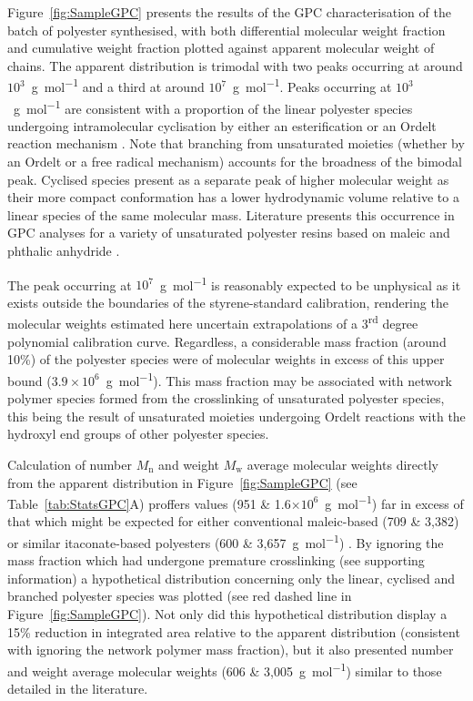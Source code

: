 Figure~\ref{fig:SampleGPC} presents the results of the GPC characterisation
 of the batch of polyester synthesised, with both differential molecular
 weight fraction and cumulative weight fraction plotted against apparent
 molecular weight of chains.
The apparent distribution is trimodal with two peaks occurring at around 
 \(10^{3}\)~\unit{\gram\per\mole} and a third at around 
 \(10^{7}\)~\unit{\gram\per\mole}.
Peaks occurring at \(10^{3}\)~\unit{\gram\per\mole} are consistent with
 a proportion of the linear polyester species undergoing intramolecular
 cyclisation by either an esterification or an Ordelt reaction mechanism
 \autocite{Molina2020}.
Note that branching from unsaturated moieties (whether by an Ordelt or
 a free radical mechanism) accounts for the broadness of the bimodal peak.
Cyclised species present as a separate peak of higher molecular weight as
 their more compact conformation has a lower hydrodynamic volume 
 relative to a linear species of the same molecular mass.
Literature presents this occurrence in GPC analyses for a variety of
 unsaturated polyester resins based on maleic and phthalic anhydride
 \autocite{Cristobal1993,Podzimek1990,Cristobal1991b}.

The peak occurring at \(10^{7}\)~\unit{\gram\per\mole} is reasonably 
 expected to be unphysical as it exists outside the boundaries of the
 styrene-standard calibration, rendering the molecular weights estimated 
 here uncertain extrapolations of a 3\textsuperscript{rd} degree polynomial
 calibration curve.
Regardless, a considerable mass fraction (around 10\%)
 of the polyester species were of molecular weights in excess of this upper 
 bound (\(3.9 \times 10^{6}\)~\unit{\gram\per\mole}).
This mass fraction may be associated with network polymer species formed 
 from the crosslinking of unsaturated polyester species, this being the 
 result of unsaturated moieties undergoing Ordelt reactions with the hydroxyl 
 end groups of other polyester species.

Calculation of number \(M_{\text{n}}\) and weight \(M_{\text{w}}\) average
 molecular weights directly from the apparent distribution in 
 Figure~\ref{fig:SampleGPC} (see Table~\ref{tab:StatsGPC}A) proffers values 
 (951 \& 1.6\(\times 10^{6}\)~\unit{\gram\per\mole}) far in excess of that 
 which might be expected for either conventional maleic-based
 (709 \& 3,382) or similar itaconate-based polyesters
 (600 \& 3,657~\unit{\gram\per\mole}) \autocite{Bamane2020}.
By ignoring the mass fraction which had undergone premature crosslinking
 (see supporting information) a hypothetical distribution concerning only
 the linear, cyclised and branched polyester species was plotted
 (see red dashed line in Figure~\ref{fig:SampleGPC}).
Not only did this hypothetical distribution display a 15\% reduction
 in integrated area relative to the apparent distribution (consistent
 with ignoring the network polymer mass fraction), but it also presented
 number and weight average molecular weights
 (606 \& 3,005~\unit{\gram\per\mole}) similar to those detailed in the
 literature.

